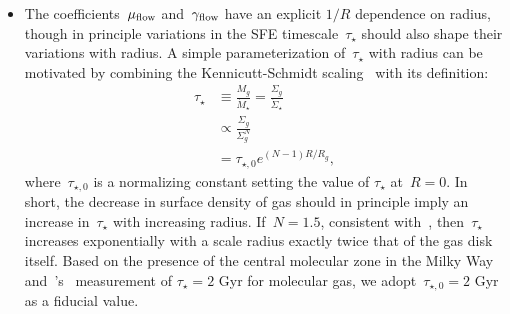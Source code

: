 \begin{itemize}
	\item The coefficients~$\mu_{\text{flow}}$ and~$\gamma_{\text{flow}}$ have an explicit
	$1 / R$ dependence on radius, though in principle variations in the SFE
	timescale~$\tau_\star$ should also shape their variations with radius.
	A simple parameterization of~$\tau_\star$ with radius can be motivated by
	combining the Kennicutt-Schmidt scaling~\citep[e.g.,][]{Schmidt1959,
	Schmidt1963, Kennicutt1998} with its definition:
	\begin{equation}\begin{split}
	\tau_\star &\equiv \frac{M_g}{\dot{M}_\star}
	= \frac{\Sigma_g}{\dot{\Sigma}_\star}
	\\
	&\propto \frac{\Sigma_g}{\Sigma_g^N}
	\\
	&= \tau_{\star,0} e^{(N - 1) R / R_g},
	\end{split}\end{equation}
	where~$\tau_{\star,0}$ is a normalizing constant setting the value of
	$\tau_\star$ at~$R = 0$.
	In short, the decrease in surface density of gas should in principle imply
	an increase in~$\tau_\star$ with increasing radius.
	If~$N = 1.5$, consistent with~\citet{Kennicutt1998}, then~$\tau_\star$
	increases exponentially with a scale radius exactly twice that of the gas
	disk itself.
	Based on the presence of the central molecular zone in the Milky Way
	\citep[e.g.,][]{Morris1996, Dahmen1998, PiercePrice2000, Hatchfield2020}
	and~\citeauthor{Leroy2008}'s~\citeyearpar{Leroy2008} measurement of
	$\tau_\star = 2$ Gyr for molecular gas, we adopt~$\tau_{\star,0} = 2$ Gyr
	as a fiducial value.

\end{itemize}

